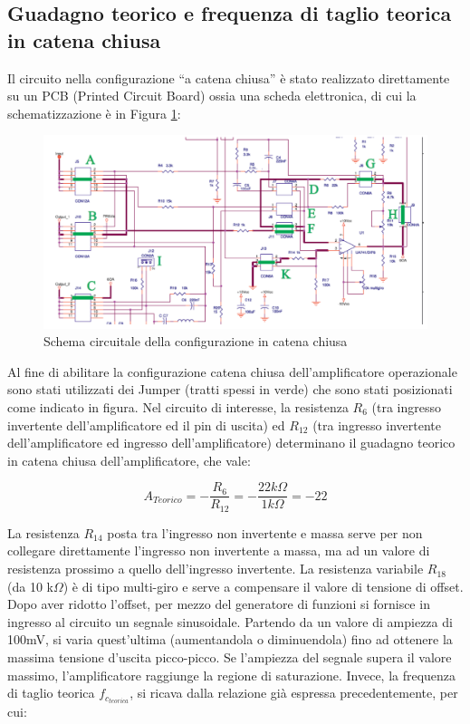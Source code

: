 \subsection{Guadagno teorico e frequenza di taglio teorica in catena chiusa}

Il circuito nella configurazione “a catena chiusa” è stato realizzato direttamente su un PCB (Printed Circuit Board) ossia una scheda elettronica, di cui la schematizzazione è in Figura \ref{fig:schemaCatenaChiusa}:
\begin{figure}[h]
    \centering
    \includegraphics[width=1\linewidth]{media/schemaCircuitaleuA741.png}
    \caption{Schema circuitale della configurazione in catena chiusa}
    \label{fig:schemaCatenaChiusa}
\end{figure}
\FloatBarrier

Al fine di abilitare la configurazione catena chiusa dell'amplificatore operazionale sono stati utilizzati dei Jumper (tratti spessi in verde) che sono stati posizionati come indicato in figura.
\FloatBarrier
Nel circuito di interesse, la resistenza \(R_6\) (tra ingresso invertente dell’amplificatore ed il pin di uscita) ed \(R_{12}\) (tra ingresso invertente dell’amplificatore ed ingresso dell’amplificatore) determinano il guadagno teorico in catena chiusa dell’amplificatore, che vale:

\[A_{Teorico}=-\frac{R_6}{R_{12}}=-\frac{22 k\Omega}{1 k\Omega}=-22\]

La resistenza \(R_{14}\) posta tra l’ingresso non invertente e massa serve per non collegare direttamente l’ingresso non invertente a massa, ma ad un valore di resistenza prossimo a quello dell’ingresso invertente. La resistenza variabile \(R_{18}\) (da 10 k\(\Omega\)) è di tipo multi-giro e serve a compensare il valore di tensione di offset. Dopo aver ridotto l’offset, per mezzo del generatore di funzioni si fornisce in ingresso al circuito un segnale sinusoidale. Partendo da un valore di ampiezza di 100mV, si varia quest'ultima  (aumentandola o diminuendola) fino ad ottenere la massima tensione d’uscita picco-picco. Se l’ampiezza del segnale supera il valore massimo, l’amplificatore raggiunge la regione di saturazione.
Invece, la frequenza di taglio teorica \(f_{c_{teorica}}\), si ricava dalla relazione già espressa precedentemente, per cui:

